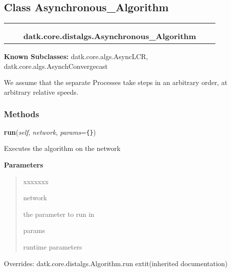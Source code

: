 \subsection{Class Asynchronous\_Algorithm}

    \label{datk:core:distalgs:Asynchronous_Algorithm}
\begin{tabular}{cccccc}
\multicolumn{2}{r}{\settowidth{\BCL}{datk.core.distalgs.Algorithm}\multirow{2}{\BCL}{datk.core.distalgs.Algorithm}}
&&
  \\\cline{3-3}
  &&\multicolumn{1}{c|}{}
&&
  \\
&&\multicolumn{2}{l}{\textbf{datk.core.distalgs.Asynchronous\_Algorithm}}
\end{tabular}

\textbf{Known Subclasses:}
datk.core.algs.AsyncLCR,
    datk.core.algs.AsynchConvergecast

We assume that the separate Processes take steps in an arbitrary order, at 
arbitrary relative speeds.



  \subsubsection{Methods}

    \vspace{0.5ex}

\hspace{.8\funcindent}\begin{boxedminipage}{\funcwidth}

    \raggedright \textbf{run}(\textit{self}, \textit{network}, \textit{params}={\tt \texttt{\{}\texttt{\}}})

\setlength{\parskip}{2ex}
    Executes the algorithm on the network

\setlength{\parskip}{1ex}
      \textbf{Parameters}
      \vspace{-1ex}

      \begin{quote}
        \begin{Ventry}{xxxxxxx}

          \item[network]

          the parameter to run in

          \item[params]

          runtime parameters

        \end{Ventry}

      \end{quote}

      Overrides: datk.core.distalgs.Algorithm.run 	extit{(inherited documentation)}

    \end{boxedminipage}

